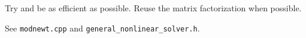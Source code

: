 \begin{problem}
\begin{subproblem}[4]
\begin{hint}
 Try and be as efficient as possible. Reuse the matrix factorization when possible.
\end{hint}

\cprotEnv \begin{solution}
See \verb|modnewt.cpp| and \verb|general_nonlinear_solver.h|.
% 
\end{solution}
\end{subproblem}

% 

\end{problem}
